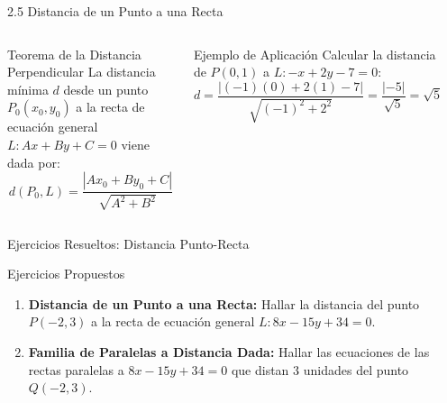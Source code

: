 \documentclass[10pt,aspectratio=169,spanish]{beamer}
\begin{document}
\begin{frame}{2.5 Distancia de un Punto a una Recta}
\begin{columns}
  \begin{block}{Teorema de la Distancia Perpendicular}
  La distancia mínima $d$ desde un punto $P_0(x_0, y_0)$ a la recta de ecuación general $L: A x + B y + C = 0$ viene dada por:
  \[
    d(P_0, L) = \frac{|A x_0 + B y_0 + C|}{\sqrt{A^2 + B^2}}
  \]
  \end{block}

  \begin{exampleblock}{Ejemplo de Aplicación}
  Calcular la distancia de $P(0,1)$ a $L: -x + 2y - 7 = 0$:
  \[
    d = \frac{|(-1)(0) + 2(1) - 7|}{\sqrt{(-1)^2 + 2^2}} = \frac{|-5|}{\sqrt{5}} = \sqrt{5}
  \]
  \end{exampleblock}

  \begin{center}
  \end{center}
\end{columns}
\end{frame}




\begin{frame}{Ejercicios Resueltos: Distancia Punto-Recta}
\begin{block}{Ejercicios Propuestos}
\begin{enumerate}
    \item \textbf{Distancia de un Punto a una Recta:} Hallar la distancia del punto $P(-2, 3)$ a la recta de ecuación general $L: 8x - 15y + 34 = 0$.

    \item \textbf{Familia de Paralelas a Distancia Dada:} Hallar las ecuaciones de las rectas paralelas a $8x - 15y + 34 = 0$ que distan $3$ unidades del punto $Q(-2, 3)$.
\end{enumerate}
\end{block}
\end{frame}
\end{document}
